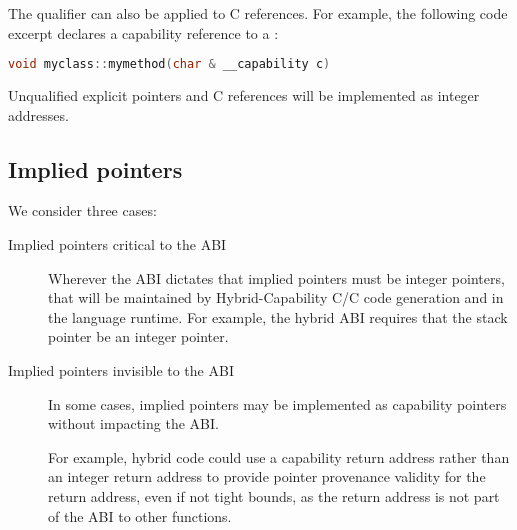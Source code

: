 \documentclass[12pt,twoside,openright,a4paper]{article}
\newcommand{\ccode}[1]{{\small\ttfamily{#1}}}
\newcommand{\cfunc}[1]{{\ccode{#1()}}}
\newcommand{\uucap}{{\ccode{\_\_capability}}\xspace}
\newcommand{\futurevariant}[1]{{\color{teal} #1}}
\newcommand{\note}[2]{{\color{blue}[ Note: #1 - #2]}}
\renewcommand{\note}[2]{\relax\ifhmode\unskip\fi}
\newcommand{\psnote}[1]{\note{#1}{Peter S.}}
\newcommand{\jrtcnote}[1]{\note{#1}{Jess C.}}
\newcommand{\dcnote}[1]{\note{#1}{David}}
\newcommand*{\cpp}{\texorpdfstring{C\textsmaller[2]{\protect\nolinebreak[4]\hspace{-.05em}\raisebox{.45ex}{\textbf{++}}}}{C++}}
\newcommand*{\COrCpp}{C/\cpp{}}
\newcommand*{\hybridCOrCpp}{Hybrid-Capability \COrCpp{}}
\begin{document}
\noindent
The \uucap qualifier can also be applied to \cpp{} references.
For example, the following code excerpt declares a capability reference to a
\ccode{char}:

\begin{lstlisting}[language=C]
void myclass::mymethod(char & __capability c)
\end{lstlisting}

\noindent
Unqualified explicit pointers and \cpp{} references will be implemented as
integer addresses.

\subsection{Implied pointers}

We consider three cases:

\begin{description}
\item[Implied pointers critical to the ABI]
  Wherever the ABI dictates that implied pointers must be integer pointers,
  that will be maintained by \hybridCOrCpp{} code generation and in the
  language runtime.
  For example, the hybrid ABI requires that the stack pointer be an integer
  pointer.
  \dcnote{This isn't clear to me as a general point.  An ISA that had an
    architectural stack pointer could have a stack capability and define the
    legacy ops that write an integer to the stack pointer to set the address.
    We couldn't do that on MIPS because the stack pointer is non-architectural
    but it would be possible on ARM.}

\item[Implied pointers invisible to the ABI]
  In some cases, implied pointers may be implemented as capability pointers
  without impacting the ABI.

\psnote{again flag more clearly that this is speculative?  The blue colour alone isn't doing it for me}
  
  \futurevariant{For example, hybrid code could use a capability return address
  rather than an integer return address to provide pointer provenance validity
  for the return address, even if not tight bounds, as the return address is
  not part of the ABI to other functions.}

  \jrtcnote{\cfunc{\_\_builtin\_return\_address} does leak these implied
  pointers to some code, and it has implications for things like libunwind, so
  it does affect the ABI. Also the kernel needs to know to put a capability in
  CRA in order for signal handlers to be able to return to \cfunc{sigcode}.
  There's a lot of subtlety here that needs to be captured.}


\end{description}
\end{document}
